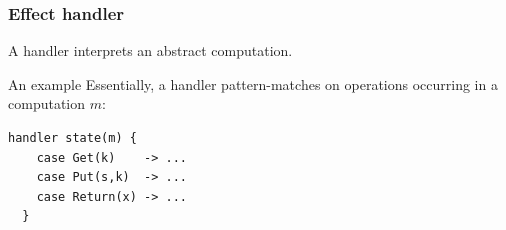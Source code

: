\begin{frame}[fragile]
  \frametitle{Effect handler}
  \begin{definition}[Handler]
    A handler interprets an abstract computation.
  \end{definition}
  \begin{block}{An example}
    Essentially, a handler pattern-matches on operations occurring in a computation $m$:
    \begin{lstlisting}[style=spacey]
  handler state(m) {
    case Get(k)    -> ...
    case Put(s,k)  -> ...
    case Return(x) -> ...
  }
    \end{lstlisting}
  \end{block}
\end{frame}






